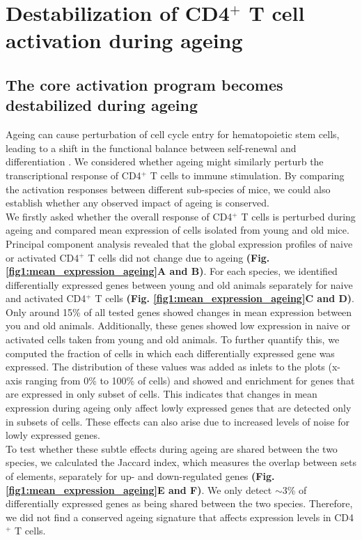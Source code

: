 \newpage

\section{Destabilization of CD4$^+$ T cell activation during ageing}
\subsection*{The core activation program becomes destabilized during ageing}

Ageing can cause perturbation of cell cycle entry for hematopoietic stem cells, leading to a shift in the functional balance between self-renewal and differentiation \citep{Kowalczyk2015}. We considered whether ageing might similarly perturb the transcriptional response of CD4$^+$ T cells to immune stimulation. By comparing the activation responses between different sub-species of mice, we could also establish whether any observed impact of ageing is conserved.\\

We firstly asked whether the overall response of CD4$^+$ T cells is perturbed during ageing and compared mean expression of cells isolated from young and old mice. Principal component analysis revealed that the global expression profiles of naive or activated CD4$^+$ T cells did not change due to ageing \textbf{(Fig. \ref{fig1:mean_expression_ageing}A and B)}. For each species, we identified differentially expressed genes between young and old animals separately for naive and activated CD4$^+$ T cells \textbf{(Fig. \ref{fig1:mean_expression_ageing}C and D)}. Only around 15\% of all tested genes showed changes in mean expression between you and old animals. Additionally, these genes showed low expression in naive or activated cells taken from young and old animals. To further quantify this, we computed the fraction of cells in which each differentially expressed gene was expressed. The distribution of these values was added as inlets to the plots (x-axis ranging from 0\% to 100\% of cells) and showed and enrichment for genes that are expressed in only subset of cells. This indicates that changes in mean expression during ageing only affect lowly expressed genes that are detected only in subsets of cells. These effects can also arise due to increased levels of noise for lowly expressed genes. \\

To test whether these subtle effects during ageing are shared between the two species, we calculated the Jaccard index, which measures the overlap between sets of elements, separately for up- and down-regulated genes \textbf{(Fig. \ref{fig1:mean_expression_ageing}E and F)}. We only detect $\sim$3\% of differentially expressed genes as being shared between the two species. Therefore, we did not find a conserved ageing signature that affects expression levels in CD4$^+$ T cells.

